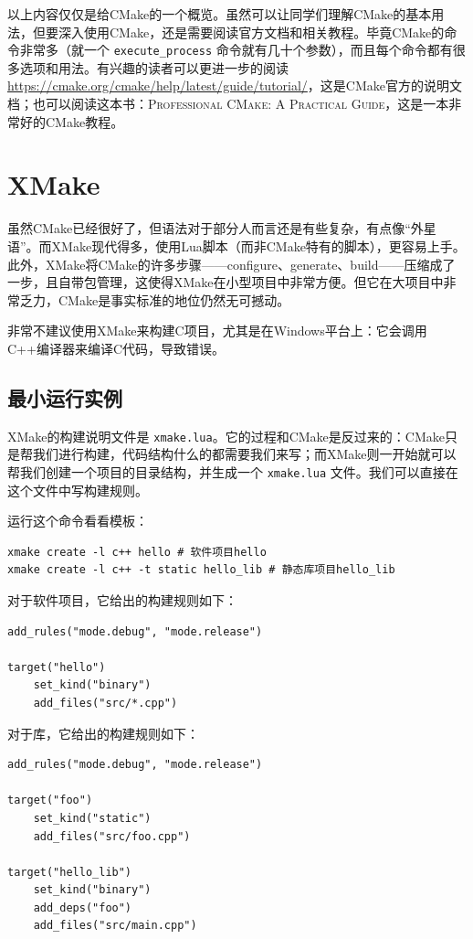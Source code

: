 以上内容仅仅是给CMake的一个概览。虽然可以让同学们理解CMake的基本用法，但要深入使用CMake，还是需要阅读官方文档和相关教程。毕竟CMake的命令非常多（就一个 \verb|execute_process| 命令就有几十个参数），而且每个命令都有很多选项和用法。有兴趣的读者可以更进一步的阅读 \url{https://cmake.org/cmake/help/latest/guide/tutorial/}，这是CMake官方的说明文档；也可以阅读这本书：\textsc{Professional CMake: A Practical Guide}，这是一本非常好的CMake教程。

\section{XMake}

虽然CMake已经很好了，但语法对于部分人而言还是有些复杂，有点像“外星语”。而XMake现代得多，使用Lua脚本（而非CMake特有的脚本），更容易上手。此外，XMake将CMake的许多步骤——configure、generate、build——压缩成了一步，且自带包管理，这使得XMake在小型项目中非常方便。但它在大项目中非常乏力，CMake是事实标准的地位仍然无可撼动。

\begin{remark}{}
    非常不建议使用XMake来构建C项目，尤其是在Windows平台上：它会调用C++编译器来编译C代码，导致错误。
\end{remark}

\subsection{最小运行实例}

XMake的构建说明文件是 \verb|xmake.lua|。它的过程和CMake是反过来的：CMake只是帮我们进行构建，代码结构什么的都需要我们来写；而XMake则一开始就可以帮我们创建一个项目的目录结构，并生成一个 \verb|xmake.lua| 文件。我们可以直接在这个文件中写构建规则。

运行这个命令看看模板：
\begin{verbatim}
xmake create -l c++ hello # 软件项目hello
xmake create -l c++ -t static hello_lib # 静态库项目hello_lib
\end{verbatim}

对于软件项目，它给出的构建规则如下：
\begin{verbatim}
add_rules("mode.debug", "mode.release")

target("hello")
    set_kind("binary")
    add_files("src/*.cpp")
\end{verbatim}

对于库，它给出的构建规则如下：
\begin{verbatim}
add_rules("mode.debug", "mode.release")

target("foo")
    set_kind("static")
    add_files("src/foo.cpp")

target("hello_lib")
    set_kind("binary")
    add_deps("foo")
    add_files("src/main.cpp")
\end{verbatim}

